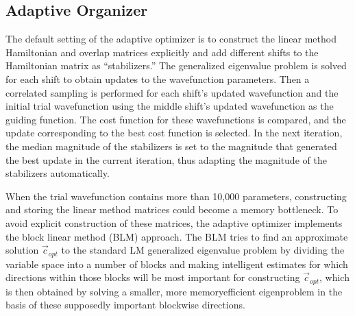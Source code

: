 \documentclass[letterpaper,10pt,english]{sphinxmanual}
\begin{document}
\subsection{Adaptive Organizer}
\label{\detokenize{methods:adaptive-organizer}}
The default setting of the adaptive optimizer is to construct the linear
method Hamiltonian and overlap matrices explicitly and add different
shifts to the Hamiltonian matrix as “stabilizers.” The generalized
eigenvalue problem is solved for each shift to obtain updates to the
wavefunction parameters. Then a correlated sampling is performed for
each shift’s updated wavefunction and the initial trial wavefunction
using the middle shift’s updated wavefunction as the guiding function.
The cost function for these wavefunctions is compared, and the update
corresponding to the best cost function is selected. In the next
iteration, the median magnitude of the stabilizers is set to the
magnitude that generated the best update in the current iteration, thus
adapting the magnitude of the stabilizers automatically.

When the trial wavefunction contains more than 10,000 parameters,
constructing and storing the linear method matrices could become a
memory bottleneck. To avoid explicit construction of these matrices, the
adaptive optimizer implements the block linear method (BLM) approach.
 The BLM tries to find an
approximate solution \(\vec{c}_{opt}\) to the standard LM
generalized eigenvalue problem by dividing the variable space into a
number of blocks and making intelligent estimates for which directions
within those blocks will be most important for constructing
\(\vec{c}_{opt}\), which is then obtained by solving a smaller, more
memory\sphinxhyphen{}efficient eigenproblem in the basis of these supposedly important
block\sphinxhyphen{}wise directions.

\begin{sphinxVerbatim}[commandchars=\\\{\}]
  

    

  
\end{sphinxVerbatim}
\end{document}
